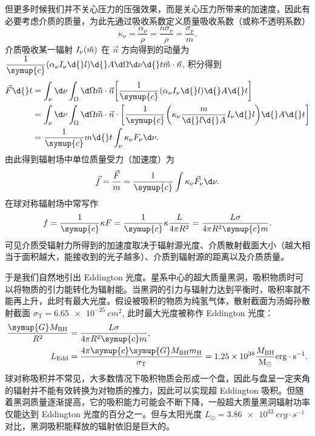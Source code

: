 \documentclass[../天体物理基础.tex]{subfiles}
\begin{document}
但更多时候我们并不关心压力的压强效果，而是关心压力所带来的加速度，因此有必要考虑介质的质量，为此先通过吸收系数定义质量吸收系数（或称不透明系数）
\begin{equation}
\kappa_{\nu}=\frac{\alpha_{\nu}}\rho=\frac{n\sigma_{\nu}}{\rho}=\frac{\sigma_{\nu}}{m}.
\end{equation}
介质吸收某一辐射 $I_{\nu}\mleft(\vec{m}\mright)$ 在 $\vec{n}$ 方向得到的动量为 $\dfrac{1}{\symup{c}}\mleft(\alpha_{\nu}I_{\nu}\d{}l\mright)\d{}A\d\Omega\d\nu\d{}t\vec{m}\cdot\vec{n}$, 积分得到
\begin{align}
\vec{F}\d{}t&=\int_{\nu}\d\nu\int_{\Omega}\d\Omega\vec{m}\cdot\vec{n}\mleft[\frac{1}{\symup{c}}\mleft(\alpha_{\nu}I_{\nu}\d{}l\mright)\d{}A\d{}t\mright]\notag\\
&=\int_{\nu}\d\nu\int_{\Omega}\d\Omega\vec{m}\cdot\vec{n}\cdot\mleft[\frac{1}{\symup{c}}\mleft(\kappa_{\nu}\frac{m}{\d{}l\d{}A}I_{\nu}\d{}l\mright)\d{}A\d{}t\mright]\notag\\
&=\frac{1}{\symup{c}}m\d{}t\int_{\nu}\kappa_{\nu}F_{\nu}\d\nu.
\end{align}
由此得到辐射场中单位质量受力（加速度）为
\begin{equation}
\vec{f}=\frac{\vec{F}}{m}=\frac{1}{\symup{c}}\int\kappa_{\nu}\vec{F}_{\nu}\d\nu.
\end{equation}
在球对称辐射场中常写作
\begin{equation}
f=\frac{1}{\symup{c}}\kappa F=\frac{1}{\symup{c}}\kappa\dfrac{L}{4\pi R^{2}}=\frac{L\sigma}{4\pi{}R^{2}\symup{c}m}.
\end{equation}
可见介质受辐射力所得到的加速度取决于辐射源光度、介质散射截面大小（越大相当于面积越大，能接收到的光子越多）、介质到辐射源的距离以及介质质量。

于是我们自然地引出 Eddington 光度。星系中心的超大质量黑洞，吸积物质时可以将物质的引力能转化为辐射能。当黑洞的引力与辐射力达到平衡时，吸积率就不能再上升，此时有最大光度。假设被吸积的物质为纯氢气体，散射截面为汤姆孙散射截面 $\sigma_{\mathrm{T}}=\qty{6.65e-25}{cm^{2}}$, 此时最大光度被称作 Eddington 光度：
\begin{align}
\frac{\symup{G}M_{\mathrm{BH}}}{R^{2}}&=\frac{L\sigma}{4\pi R^{2}\symup{c}m},\\
L_{\mathrm{Edd}}&=\frac{4\pi\symup{c}\symup{G}M_{\mathrm{BH}}m_{\ce{H}}}{\sigma_{\mathrm{T}}}=1.25\times10^{38}\frac{M_{\mathrm{BH}}}{\unit{M_{\odot}}}\unit{erg\cdot{}s^{-1}}.
\end{align}
球对称吸积并不常见，大多数情况下吸积物质会形成一个盘，因此与盘呈一定夹角的辐射并不能有效转换为对物质的推力，因此可以实现超 Eddington 吸积。但随着黑洞质量逐渐提高，它的吸积能力可能会不断下降，一般超大质量黑洞辐射功率仅能达到 Eddington 光度的百分之一。但与太阳光度 $L_{\odot}=\qty{3.86e33}{erg\cdot{}s^{-1}}$ 对比，黑洞吸积能释放的辐射依旧是巨大的。
\end{document}
